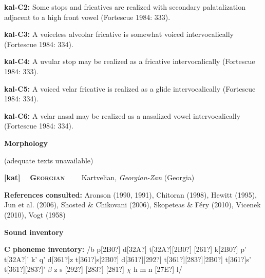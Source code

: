 \begin{styleBody}
\textbf{kal-C2: }Some stops and fricatives are realized with secondary palatalization adjacent to a high front vowel (Fortescue 1984: 333).
\end{styleBody}

\begin{styleBody}
\textbf{kal-C3: }A voiceless alveolar fricative is somewhat voiced intervocalically (Fortescue 1984: 334).
\end{styleBody}

\begin{styleBody}
\textbf{kal-C4: }A uvular stop may be realized as a fricative intervocalically (Fortescue 1984: 333).
\end{styleBody}

\begin{styleBody}
\textbf{kal-C5: }A voiced velar fricative is realized as a glide intervocalically (Fortescue 1984: 334).
\end{styleBody}

\begin{styleBody}
\textbf{kal-C6: }A velar nasal may be realized as a nasalized vowel intervocalically (Fortescue 1984: 334).
\end{styleBody}

\begin{styleBody}
\textbf{Morphology}
\end{styleBody}

\begin{styleBody}
(adequate texts unavailable)
\end{styleBody}

\clearpage\begin{styleBody}
\textbf{[kat] }\ \ \textbf{\textsc{Georgian}}\textbf{\ \ \ \ }Kartvelian, \textit{Georgian-Zan} (Georgia)
\end{styleBody}

\begin{styleBody}
\textbf{References consulted: }Aronson (1990, 1991), Chitoran (1998), Hewitt (1995), Jun et al. (2006), Shosted \& Chikovani (2006), Skopeteas \& Féry (2010), Vicenek (2010), Vogt (1958)
\end{styleBody}

\begin{styleBody}
\textbf{Sound inventory}
\end{styleBody}

\begin{styleBody}
\textbf{C phoneme inventory:} /b p[2B0?] d[32A?] t[32A?][2B0?] [261?] k[2B0?] p’ t[32A?]’ k’ q’ d[361?]z t[361?]s[2B0?] d[361?][292?] t[361?][283?][2B0?] t[361?]s’ t[361?][283?]’ $\beta $ z s [292?] [283?] [281?] $\chi $ h m n [27E?] l/
\end{styleBody}

